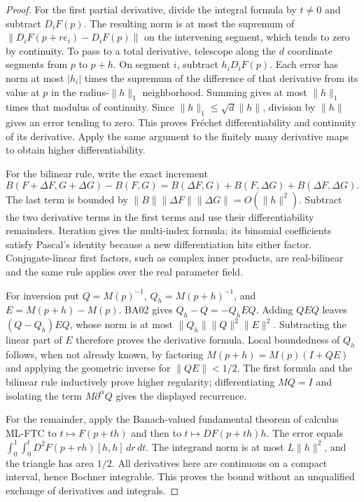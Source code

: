 \documentclass[11pt,a4paper]{article}
\theoremstyle{remark}\newtheorem{remark}[theorem]{Remark}
\begin{document}
\begin{proof}
For the first partial derivative, divide the integral formula by $t\ne0$ and subtract $D_iF(p)$. The resulting norm is at most the supremum of $\|D_iF(p+re_i)-D_iF(p)\|$ on the intervening segment, which tends to zero by continuity. To pass to a total derivative, telescope along the $d$ coordinate segments from $p$ to $p+h$. On segment $i$, subtract $h_iD_iF(p)$. Each error has norm at most $|h_i|$ times the supremum of the difference of that derivative from its value at $p$ in the radius-$\|h\|_1$ neighborhood. Summing gives at most $\|h\|_1$ times that modulus of continuity. Since $\|h\|_1\leq\sqrt d\|h\|$, division by $\|h\|$ gives an error tending to zero. This proves Fr\'echet differentiability and continuity of its derivative. Apply the same argument to the finitely many derivative maps to obtain higher differentiability.

For the bilinear rule, write the exact increment
\[
 B(F+\Delta F,G+\Delta G)-B(F,G)
 =B(\Delta F,G)+B(F,\Delta G)+B(\Delta F,\Delta G).
\]
The last term is bounded by $\|B\|\|\Delta F\|\|\Delta G\|=O(\|h\|^2)$. Subtract the two derivative terms in the first terms and use their differentiability remainders. Iteration gives the multi-index formula; its binomial coefficients satisfy Pascal's identity because a new differentiation hits either factor. Conjugate-linear first factors, such as complex inner products, are real-bilinear and the same rule applies over the real parameter field.

For inversion put $Q=M(p)^{-1}$, $Q_h=M(p+h)^{-1}$, and $E=M(p+h)-M(p)$. BA02 gives $Q_h-Q=-Q_hEQ$. Adding $QEQ$ leaves $(Q-Q_h)EQ$, whose norm is at most $\|Q_h\|\|Q\|^2\|E\|^2$. Subtracting the linear part of $E$ therefore proves the derivative formula. Local boundedness of $Q_h$ follows, when not already known, by factoring $M(p+h)=M(p)(I+QE)$ and applying the geometric inverse for $\|QE\|<1/2$. The first formula and the bilinear rule inductively prove higher regularity; differentiating $MQ=I$ and isolating the term $M\partial^\alpha Q$ gives the displayed recurrence.

For the remainder, apply the Banach-valued fundamental theorem of calculus ML-FTC to $t\mapsto F(p+th)$ and then to $t\mapsto DF(p+th)h$. The error equals
$\int_0^1\int_0^t D^2F(p+rh)[h,h]\,dr\,dt$.
The integrand norm is at most $L\|h\|^2$, and the triangle has area $1/2$. All derivatives here are continuous on a compact interval, hence Bochner integrable. This proves the bound without an unqualified exchange of derivatives and integrals.
\end{proof}
\end{document}
